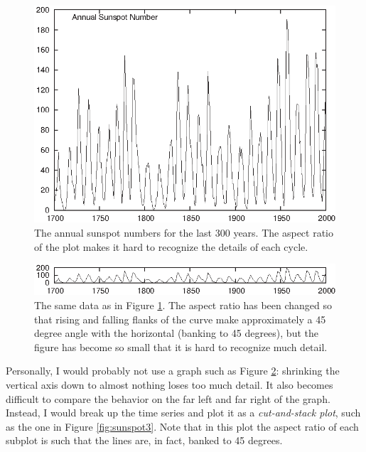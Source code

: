 \begin{figure}
  \centerline{\includegraphics{img/sunspot1}}
  \caption{The annual sunspot numbers for the last 300 years. The
    aspect ratio of the plot makes it hard to recognize the details of
    each cycle.}
  \label{fig:sunspot1}%
\end{figure}

\begin{figure}
  \centerline{\includegraphics{img/sunspot2}}
  \caption{The same data as in Figure \ref{fig:sunspot1}. The aspect
    ratio has been changed so that rising and falling flanks of the
    curve make approximately a 45 degree angle with the horizontal
    (banking to 45 degrees), but the figure has become so small that
    it is hard to recognize much detail.}
  \label{fig:sunspot2}\vspace*{-6pt}
\end{figure} 

Personally, I would probably not use a graph such as Figure
\ref{fig:sunspot2}: shrinking the vertical axis down to almost nothing
loses too much detail. It also becomes difficult to compare the
behavior on the far left and far right of the graph. Instead, I would
break up the time series and plot it as a \emph{cut-and-stack plot},
such as the one in Figure \ref{fig:sunspot3}. Note that in this plot
the aspect ratio of each subplot is such that the lines are, in fact,
banked to 45 degrees.

